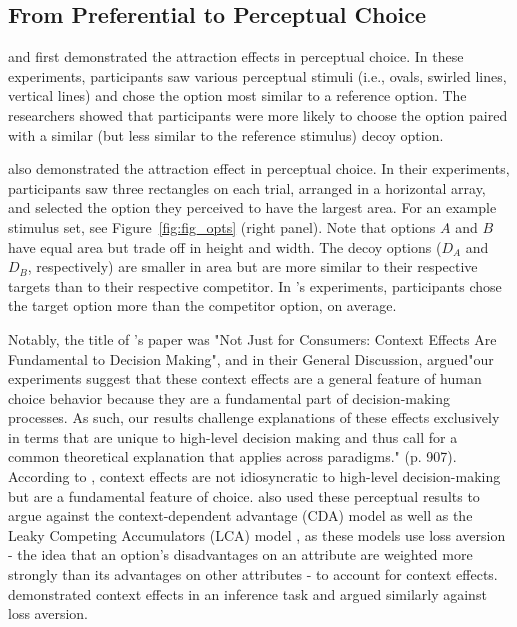 \subsection{From Preferential to Perceptual Choice}

\textcite{choplinComparisoninducedDecoyEffects2005b} and \textcite{yearsleyContextEffectsSimilarity2022} first demonstrated the attraction effects in perceptual choice. In these experiments, participants saw various perceptual stimuli (i.e., ovals, swirled lines, vertical lines) and chose the option most similar to a reference option. The researchers showed that participants were more likely to choose the option paired with a similar (but less similar to the reference stimulus) decoy option.

\textcite{trueblood2013not} also demonstrated the attraction effect in perceptual choice. In their experiments, participants saw three rectangles on each trial, arranged in a horizontal array, and selected the option they perceived to have the largest area. For an example stimulus set, see Figure~\ref{fig:fig_opts} (right panel). Note that options $A$ and $B$ have equal area but trade off in height and width. The decoy options ($D_{A}$ and $D_{B}$, respectively) are smaller in area but are more similar to their respective targets than to their respective competitor. In \textcite{trueblood2013not}'s experiments, participants chose the target option more than the competitor option, on average. 

Notably, the title of \textcite{trueblood2013not}'s paper was "Not Just for Consumers: Context Effects Are Fundamental to Decision Making", and in their General Discussion, \textcite{trueblood2013not} argued"our experiments suggest that these context effects are a general feature of human choice behavior because they are a fundamental part of decision-making processes. As such, our results challenge explanations of these effects exclusively in terms that are unique to high-level decision making and thus call for a common theoretical explanation that applies across paradigms." (p. 907). According to \textcite{trueblood2013not}, context effects are not idiosyncratic to high-level decision-making but are a fundamental feature of choice. \textcite{trueblood2013not} also used these perceptual results to argue against the context-dependent advantage (CDA) model \parencite{tversky1993context} as well as the Leaky Competing Accumulators (LCA) model \parencite{usherLossAversionInhibition2004a}, as these models use loss aversion  - the idea that an option's disadvantages on an attribute are weighted more strongly than its advantages on other attributes - to account for context effects. \textcite{truebloodMultialternativeContextEffects2012} demonstrated context effects in an inference task and argued similarly against loss aversion.

